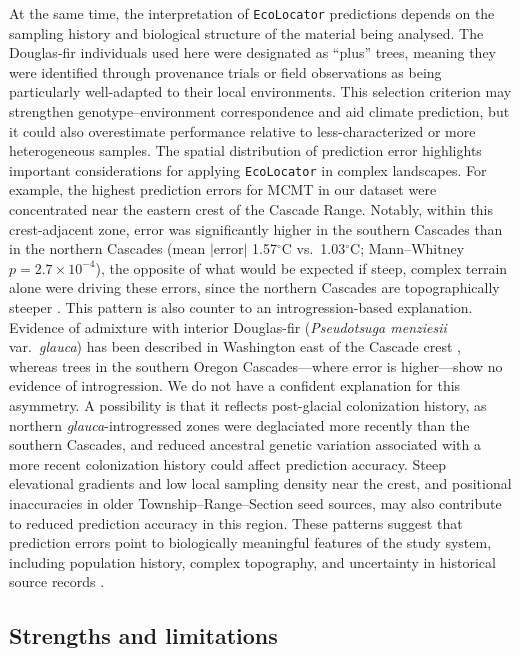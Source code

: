 \documentclass[]{article}
\newcommand{\dfir}{Douglas-fir\xspace}
\newcommand{\ecolocator}{\texttt{EcoLocator}\xspace}
\begin{document}
At the same time,
the interpretation of \ecolocator predictions depends on
the sampling history and biological structure of the material being analysed.
The \dfir individuals used here were designated as ``plus'' trees,
meaning they were identified through provenance trials
or field observations as being particularly well-adapted
to their local environments.
This selection criterion may strengthen genotype--environment correspondence
and aid climate prediction,
but it could also overestimate performance relative to
less-characterized or more heterogeneous samples.
The spatial distribution of prediction error highlights
important considerations for applying \ecolocator in complex landscapes.
For example, the highest prediction errors for MCMT in our dataset
were concentrated near the eastern crest of the Cascade Range.
Notably, within this crest-adjacent zone, error was significantly higher
in the southern Cascades than in the northern Cascades
(mean $\lvert\text{error}\rvert$ 1.57$^\circ$C vs.\ 1.03$^\circ$C;
Mann--Whitney $p=2.7\times10^{-4}$), the opposite of what would be expected
if steep, complex terrain alone were driving these errors, since the
northern Cascades are topographically steeper \citep{haugerud2009}. This pattern is
also counter to an introgression-based explanation. Evidence of
admixture with interior \dfir
(\textit{Pseudotsuga menziesii} var.\ \textit{glauca}) has been described
in Washington east of the Cascade crest
\citep{stclair_genecology_2005, pelaez_spatially_2024},
whereas trees in the southern Oregon Cascades---where error is
higher---show no evidence of introgression. We do not have a confident
explanation for this asymmetry. A possibility is that it reflects
post-glacial colonization history, as northern
\textit{glauca}-introgressed zones were deglaciated more recently than
the southern Cascades, and reduced ancestral genetic variation
associated with a more recent colonization history could affect
prediction accuracy. Steep elevational gradients and low local
sampling density near the crest, and positional inaccuracies in older
Township--Range--Section seed sources, may also contribute
to reduced prediction accuracy in this region.
These patterns suggest that prediction errors
point to biologically meaningful features of the study system,
including population history,
complex topography,
and uncertainty in historical source records \citep{rehmann2024evaluating}.

\subsection{Strengths and limitations}
\label{sec:strengths-limitations}
\end{document}
